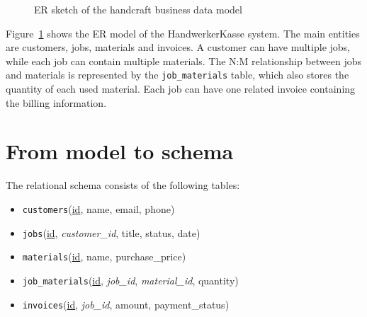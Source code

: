 \documentclass[11pt,a4paper]{article}
\begin{document}
\begin{figure}[ht]
  \centering
  \caption{ER sketch of the handcraft business data model}
  \label{fig:er}
\end{figure}

Figure~\ref{fig:er} shows the ER model of the HandwerkerKasse system.
The main entities are customers, jobs, materials and invoices.
A customer can have multiple jobs, while each job can contain multiple
materials. The N:M relationship between jobs and materials is represented by
the \texttt{job\_materials} table, which also stores the quantity of each used material.
Each job can have one related invoice containing the billing information.

\section{From model to schema}

The relational schema consists of the following tables:

\begin{itemize}
  \item \texttt{customers}(\underline{id}, name, email, phone)
  \item \texttt{jobs}(\underline{id}, 
        \emph{customer\_id}, title, status, date)
  \item \texttt{materials}(\underline{id}, name, purchase\_price)
  \item \texttt{job\_materials}(\underline{id},
        \emph{job\_id}, \emph{material\_id}, quantity)
  \item \texttt{invoices}(\underline{id},
        \emph{job\_id}, amount, payment\_status)
\end{itemize}
\end{document}
